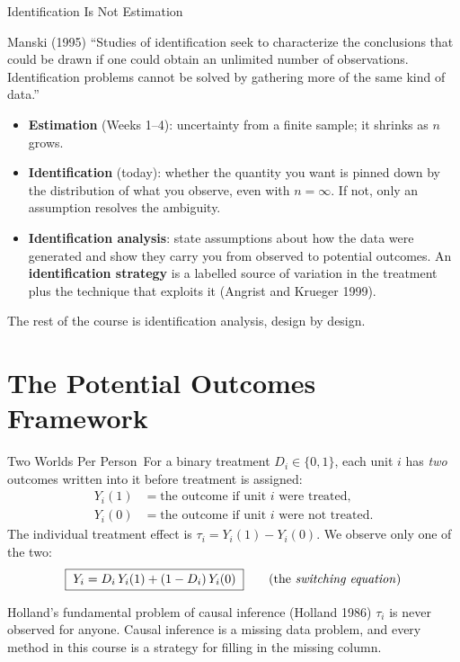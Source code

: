 \documentclass[aspectratio=169,11pt,xcolor=dvipsnames]{beamer}
\newcommand{\srcp}[1]{{\scriptsize\color{gray}(#1)}}
\newcommand{\core}{\,\raisebox{0.6pt}{\textcolor{corestar}{$\bigstar$}}}
\begin{document}
\begin{frame}{Identification Is Not Estimation}
\begin{block}{Manski (1995)}
``Studies of identification seek to characterize the conclusions that could
be drawn if one could obtain an unlimited number of observations.
Identification problems cannot be solved by gathering more of the same kind
of data.''
\end{block}
\vskip3pt
\begin{itemize}\itemsep3pt
  \item \textbf{Estimation} (Weeks 1--4): uncertainty from a finite sample;
        it shrinks as $n$ grows.
  \item \textbf{Identification} (today): whether the quantity you want is
        pinned down by the distribution of what you observe, even with
        $n = \infty$. If not, only an assumption resolves the ambiguity.
  \item \textbf{Identification analysis}: state assumptions about how the
        data were generated and show they carry you from observed to
        potential outcomes. An \textbf{identification strategy} is a
        labelled source of variation in the treatment plus the technique
        that exploits it \srcp{Angrist and Krueger 1999}.
\end{itemize}
The rest of the course is identification analysis, design by design.
\end{frame}

\section[Potential Outcomes]{The Potential Outcomes Framework}
\begin{frame}\sectionpage\end{frame}

\begin{frame}{Two Worlds Per Person\core}
For a binary treatment $D_i \in \{0,1\}$, each unit $i$ has \emph{two}
outcomes written into it before treatment is assigned:
\begin{align*}
  Y_i(1) &= \text{the outcome if unit } i \text{ were treated,} \\
  Y_i(0) &= \text{the outcome if unit } i \text{ were not treated.}
\end{align*}
The \alert{individual treatment effect} is $\tau_i = Y_i(1) - Y_i(0)$.
We observe only one of the two:
\begin{align*}
  \boxed{\;Y_i = D_i\,Y_i(1) + (1-D_i)\,Y_i(0)\;}
  \qquad\text{(the \emph{switching equation})}
\end{align*}
\begin{block}{Holland's fundamental problem of causal inference \srcp{Holland 1986}}
$\tau_i$ is never observed for anyone. Causal inference is a \alert{missing
data problem}, and every method in this course is a strategy for filling in
the missing column.
\end{block}
\end{frame}
\end{document}
